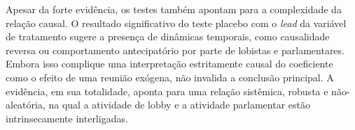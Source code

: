 Apesar da forte evidência, os testes também apontam para a complexidade da relação causal. O resultado significativo do teste placebo com o \textit{lead} da variável de tratamento sugere a presença de dinâmicas temporais, como causalidade reversa ou comportamento antecipatório por parte de lobistas e parlamentares. Embora isso complique uma interpretação estritamente causal do coeficiente como o efeito de uma reunião exógena, não invalida a conclusão principal. A evidência, em sua totalidade, aponta para uma relação sistêmica, robusta e não-aleatória, na qual a atividade de lobby e a atividade parlamentar estão intrinsecamente interligadas.








